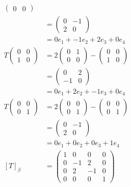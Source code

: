 \documentclass[13pt]{article}
\begin{document}
\begin{enumerate}[label=(\alph*),leftmargin=*]
\begin{align*}
\begin{pmatrix}
                      0 & 0
                    \end{pmatrix} \\
        &=
          \begin{pmatrix}
            0 & -1 \\
            2 & 0
          \end{pmatrix} \\
        &= 0e_1 + -1e_2 + 2e_3 + 0e_4 \\
    T
    \begin{pmatrix}
      0 & 0 \\
      1 & 0 
    \end{pmatrix} &= 2
                    \begin{pmatrix}
                      0 & 1 \\
                      0 & 0
                    \end{pmatrix} -
                    \begin{pmatrix}
                      0 & 0 \\
                      1 & 0
                    \end{pmatrix} \\
        &=
          \begin{pmatrix}
            0 & 2 \\
            -1 & 0
          \end{pmatrix} \\
        &= 0e_1 + 2e_2 + -1e_3 + 0e_4 \\
    T
    \begin{pmatrix}
      0 & 0 \\
      0 & 1 
    \end{pmatrix} &= 2
                    \begin{pmatrix}
                      0 & 0 \\
                      0 & 1
                    \end{pmatrix} -
                    \begin{pmatrix}
                      0 & 0 \\
                      0 & 1
                    \end{pmatrix} \\
        &=
          \begin{pmatrix}
            0 & -1 \\
            2 & 0
          \end{pmatrix} \\
        &= 0e_1 + 0e_2 + 0e_3 + 1e_4 \\
    [T]_\beta &=
                \begin{pmatrix}
                  1 & 0 & 0 & 0 \\
                  0 & -1 & 2 & 0 \\
                  0 & 2 & -1 & 0 \\
                  0 & 0 & 0 & 1
                \end{pmatrix}
  \end{align*}


\end{enumerate}
\end{document}
